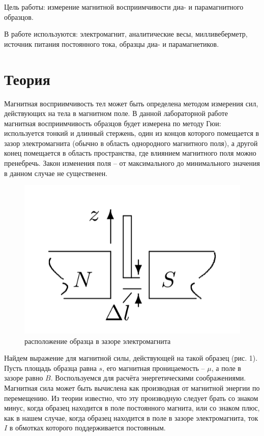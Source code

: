 \documentclass[a4paper,14pt]{article}
\begin{document}
\author{Рябых Владислав и Исыпов Илья, Б05-905}
\title{}
\maketitle

Цель работы: измерение магнитной восприимчивости диа- и парамагнитного образцов.

В работе используются: электромагнит, аналитические весы, милливеберметр, источник питания постоянного тока, образцы диа- и парамагнетиков.


\section*{Теория}
Магнитная восприимчивость тел может быть определена методом измерения сил, действующих на тела в магнитном поле. В данной лабораторной работе магнитная восприимчивость образцов будет измерена по методу Гюи: используется тонкий и длинный стержень, один из концов которого помещается в зазор электромагнита (обычно в область однородного магнитного поля), а другой конец помещается в область пространства, где влиянием магнитного поля можно пренебречь. Закон изменения поля -- от максимального до минимального значения в данном случае не существенен. 

\begin{figure}[bhtp]
	\centering
	\includegraphics[width=0.3\linewidth]{first}
	\caption{расположение образца в зазоре электромагнита}
\end{figure}
	
	Найдем выражение для магнитной силы, действующей на такой образец (рис. 1). Пусть площадь образца равна $s$, его магнитная проницаемость -- $\mu$, а поле в зазоре равно $B$.
	Воспользуемся для расчёта энергетическими соображениями. Магнитная сила может быть вычислена как производная от магнитной энергии по перемещению. Из теории известно, что эту производную следует брать со знаком минус, когда образец находится в поле постоянного магнита, или со знаком плюс, как в нашем случае, когда образец находится в поле в зазоре электромагнита, ток $I$ в обмотках которого поддерживается постоянным.
\end{document}
